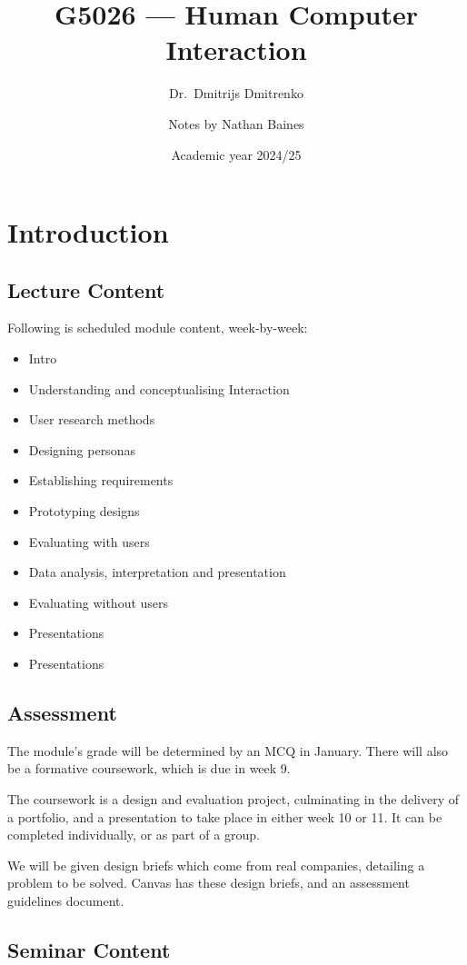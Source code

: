 \documentclass[a4paper]{article}
\title{G5026 --- Human Computer Interaction}
\author{Dr.\ Dmitrijs Dmitrenko \and Notes by Nathan Baines}
\date{Academic year 2024/25}
\begin{document}
\maketitle

\section{Introduction}

\subsection{Lecture Content}
Following is scheduled module content, week-by-week:
\begin{itemize}
    \item Intro
    \item Understanding and conceptualising Interaction
    \item User research methods
    \item Designing personas
    \item Establishing requirements
    \item Prototyping designs
    \item Evaluating with users
    \item Data analysis, interpretation and presentation
    \item Evaluating without users
    \item Presentations
    \item Presentations
\end{itemize}

\subsection{Assessment}
The module's grade will be determined by an MCQ in January. There will also be a formative coursework, which is due in week 9.

The coursework is a design and evaluation project, culminating in the delivery of a portfolio, and a presentation to take place in
either week 10 or 11. It can be completed individually, or as part of a group.

We will be given design briefs which come from real companies, detailing a problem to be solved. Canvas has these design briefs, and an
assessment guidelines document.

\subsection{Seminar Content}
\end{document}
